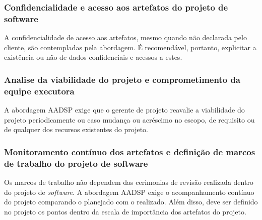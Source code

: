 \documentclass{acm_proc_article-sp}
\begin{document}
\subsubsection*{Confidencialidade e acesso aos artefatos do projeto de software}
A confidencialidade de acesso aos artefatos, mesmo quando não declarada pelo cliente, são contempladas pela abordagem. É recomendável, portanto, explicitar a existência ou não de dados confidenciais e acessos a estes\cite{aadsp:hibirdo}.

\subsubsection*{Analise da viabilidade do projeto e comprometimento da equipe executora}
A abordagem AADSP exige que o gerente de projeto reavalie a viabilidade do projeto periodicamente ou caso mudança ou acréscimo no escopo, de requisito ou de qualquer dos recursos existentes do projeto\cite{aadsp:hibirdo}.

\subsubsection*{Monitoramento contínuo dos artefatos e definição de marcos de trabalho do projeto de software}
Os marcos de trabalho não dependem das cerimonias de revisão realizada dentro do projeto de \textit{software}.  A abordagem AADSP exige o acompanhamento contínuo do projeto comparando o planejado com o realizado. Além disso, deve ser definido no projeto os pontos dentro da escala de importância dos artefatos do projeto. 
\end{document}
